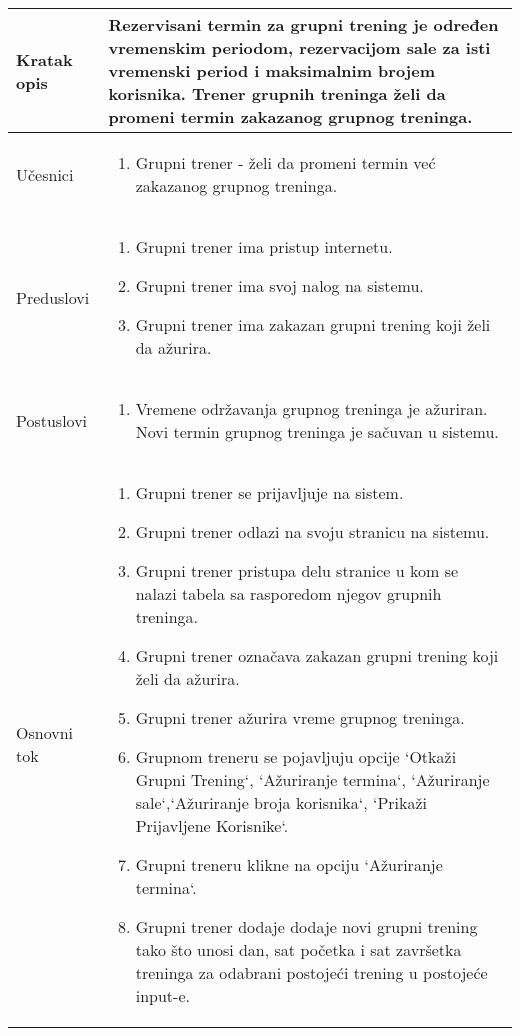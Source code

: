 \documentclass[../grupniTreninzi.tex]{subfiles}
\begin{document}
\begin{longtable}{| p{} | p{} |} 
\hline
    Kratak opis &  Rezervisani termin za grupni trening je određen vremenskim periodom, rezervacijom sale za isti vremenski period i maksimalnim brojem korisnika. Trener grupnih treninga želi da promeni termin zakazanog grupnog treninga.\\ 
\hline    
    Učesnici &
    \begin{enumerate}
        \item Grupni trener - želi da promeni termin već zakazanog grupnog treninga.
    \end{enumerate}\\
\hline
   Preduslovi & 
   \begin{enumerate}
        \item Grupni trener ima pristup internetu.
        \item Grupni trener ima svoj nalog na sistemu.
        \item Grupni trener ima zakazan grupni trening koji želi da ažurira.
    \end{enumerate}\\
\hline  
    Postuslovi &
    \begin{enumerate}
        \item Vremene održavanja grupnog treninga je ažuriran. Novi termin grupnog treninga je sačuvan u sistemu.
    \end{enumerate}\\
\hline
    Osnovni tok & 
    \begin{enumerate}
        \item Grupni trener se prijavljuje na sistem.
        \item Grupni trener odlazi na svoju stranicu na sistemu.
        \item Grupni trener pristupa delu stranice u kom se nalazi tabela sa rasporedom njegov grupnih treninga.
        \item Grupni trener označava zakazan grupni trening koji želi da ažurira.
        \item Grupni trener ažurira vreme grupnog treninga.
        \item Grupnom treneru se pojavljuju opcije `Otkaži Grupni Trening`, `Ažuriranje termina`, `Ažuriranje sale`,`Ažuriranje broja korisnika`, `Prikaži Prijavljene Korisnike`.
        \item Grupni treneru klikne na opciju  `Ažuriranje termina`. 
        \item Grupni trener dodaje dodaje novi grupni trening tako što unosi dan, sat početka i sat završetka treninga za odabrani postojeći trening u postojeće input-e.

\end{enumerate}
\end{longtable}
\end{document}
